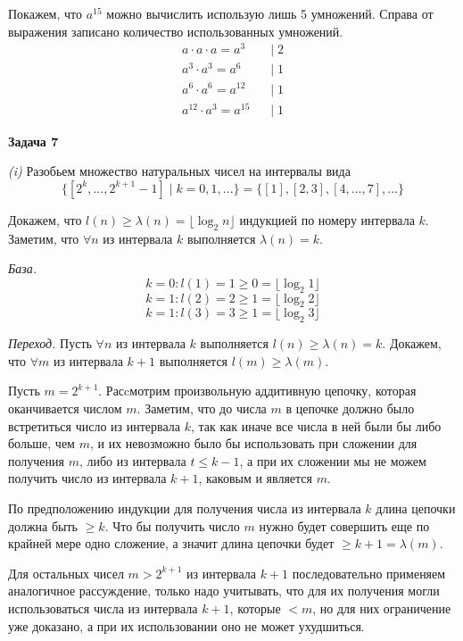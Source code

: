 \documentclass[10pt]{article}
\begin{document}
Покажем, что $a^{15}$ можно вычислить использую лишь 5 умножений.
Справа от выражения записано количество использованных умножений.
\begin{align*}
  a \cdot a \cdot a = a^3 \;\;\; &| \; 2\\
  a^3 \cdot a^3 = a^6 \;\;\; &| \; 1\\
  a^6 \cdot a^6 = a^{12} \;\;\; &| \; 1\\
  a^{12} \cdot a^3 = a^{15} \;\;\; &| \; 1
\end{align*}

\medskip

{\bf Задача 7}

{\it (i)}
Разобьем множество натуральных чисел на интервалы вида
$$\{ [ 2^k, ..., 2^{k + 1} - 1 ] \; | \; k = 0, 1, ... \} = \{ [1], [2, 3], [4, ..., 7], ... \}$$

Докажем, что $l(n) \geq \lambda(n) = \lfloor \log_2{n} \rfloor$ индукцией по номеру интервала $k$.
Заметим, что $\forall n$ из интервала $k$ выполняется $\lambda(n) = k$.

{\it База.}
$$k = 0: l(1) = 1 \geq 0 = \lfloor \log_2{1} \rfloor$$
$$k = 1: l(2) = 2 \geq 1 = \lfloor \log_2{2} \rfloor$$
$$k = 1: l(3) = 3 \geq 1 = \lfloor \log_2{3} \rfloor$$

{\it Переход.}
Пусть $\forall n$ из интервала $k$ выполняется $l(n) \geq \lambda(n) = k$.
Докажем, что $\forall m$ из интервала $k + 1$ выполняется $l(m) \geq \lambda(m)$.

Пусть $m = 2^{k + 1}$.
Расcмотрим произвольную аддитивную цепочку, которая оканчивается числом $m$.
Заметим, что до числа $m$ в цепочке должно было встретиться число из интервала $k$, так как иначе все числа в ней были бы либо больше, чем $m$, и их невозможно было бы использовать при сложении для получения $m$, либо из интервала $t \leq k - 1$, а при их сложении мы не можем получить число из интервала $k + 1$, каковым и является $m$.

По предположению индукции для получения числа из интервала $k$ длина цепочки должна быть $\geq k$.
Что бы получить число $m$ нужно будет совершить еще по крайней мере одно сложение, а значит длина цепочки будет $\geq k + 1 = \lambda(m)$.

Для остальных чисел $m > 2^{k + 1}$ из интервала $k + 1$ последовательно применяем аналогичное рассуждение, только надо учитывать, что для их получения могли использоваться числа из интервала $k + 1$, которые $< m$, но для них ограничение уже доказано, а при их использовании оно не может ухудшиться.
\end{document}
